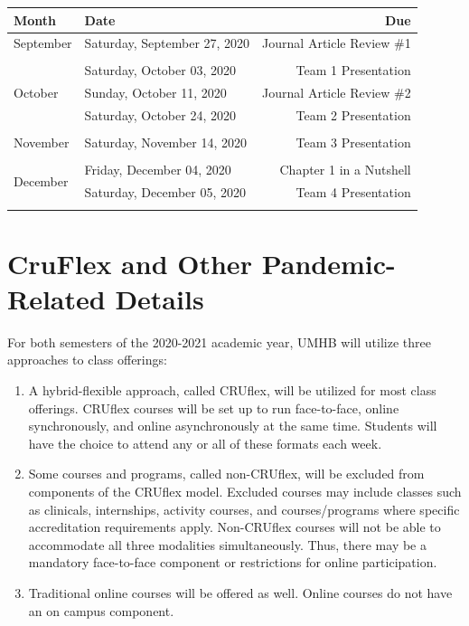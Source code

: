 \documentclass[
]{article}
\begin{document}
\begin{tabularx}{\linewidth}{p{4cm}Xr}
\hline
\textbf{Month} & \textbf{Date} & \textbf{Due} \\
\hline
\multirow{1}{*}{September} & Saturday, September 27, 2020 & Journal Article Review \#1 \\
\arrayrulecolor{gray}\hline
&  &  \\

\multirow{3}{*}{October} & Saturday, October 03, 2020 & Team 1 Presentation \\
& Sunday, October 11, 2020 & Journal Article Review \#2 \\
& Saturday, October 24, 2020 & Team 2 Presentation \\
\arrayrulecolor{gray}\hline
&  &  \\

\multirow{1}{*}{November} & Saturday, November 14, 2020 & Team 3 Presentation \\
\arrayrulecolor{gray}\hline
&  &  \\

\multirow{2}{*}{December} & Friday, December 04, 2020 & Chapter 1 in a Nutshell \\
& Saturday, December 05, 2020 & Team 4 Presentation \\
\arrayrulecolor{gray}\hline
&  &  \\

\end{tabularx}

\newpage
\section{CruFlex and Other Pandemic-Related Details}

For both semesters of the 2020-2021 academic year, UMHB will utilize
three approaches to class offerings:

\begin{enumerate}
\item A hybrid-flexible approach, called CRUflex, will be utilized for most class offerings. CRUflex courses will be set up to run face-to-face, online synchronously, and online asynchronously at the same time. Students will have the choice to attend any or all of these formats each week.
\item Some courses and programs, called non-CRUflex, will be excluded from components of the CRUflex model. Excluded courses may include classes such as clinicals, internships, activity courses, and courses/programs where specific accreditation requirements apply. Non-CRUflex courses will not be able to accommodate all three modalities simultaneously. Thus, there may be a mandatory face-to-face component or restrictions for online participation.
\item Traditional online courses will be offered as well. Online courses do not have an on campus component.
\end{enumerate}
\end{document}
